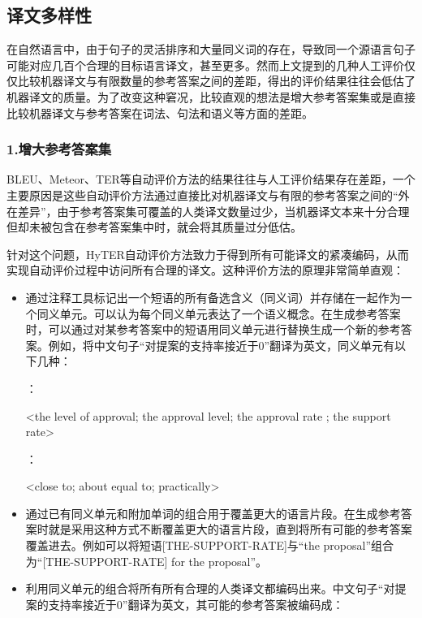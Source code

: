 \subsection{译文多样性}

\parinterval 在自然语言中，由于句子的灵活排序和大量同义词的存在，导致同一个源语言句子可能对应几百个合理的目标语言译文，甚至更多。然而上文提到的几种人工评价仅仅比较机器译文与有限数量的参考答案之间的差距，得出的评价结果往往会低估了机器译文的质量。为了改变这种窘况，比较直观的想法是增大参考答案集或是直接比较机器译文与参考答案在词法、句法和语义等方面的差距。


\subsubsection{1.增大参考答案集}

\parinterval BLEU、Meteor、TER等自动评价方法的结果往往与人工评价结果存在差距，一个主要原因是这些自动评价方法通过直接比对机器译文与有限的参考答案之间的“外在差异”，由于参考答案集可覆盖的人类译文数量过少，当机器译文本来十分合理但却未被包含在参考答案集中时，就会将其质量过分低估。

\parinterval 针对这个问题，HyTER自动评价方法致力于得到所有可能译文的紧凑编码，从而实现自动评价过程中访问所有合理的译文。这种评价方法的原理非常简单直观：

\begin{itemize}
\vspace{0.5em}
\item 通过注释工具标记出一个短语的所有备选含义（同义词）并存储在一起作为一个同义单元。可以认为每个同义单元表达了一个语义概念。在生成参考答案时，可以通过对某参考答案中的短语用同义单元进行替换生成一个新的参考答案。例如，将中文句子“对提案的支持率接近于0”翻译为英文，同义单元有以下几种：

：

\parinterval <the level of approval; the approval level; the approval rate ; the support rate>

\noindent [CLOSE-TO]：

\parinterval <close to; about equal to; practically>
\vspace{0.5em}
\item 通过已有同义单元和附加单词的组合用于覆盖更大的语言片段。在生成参考答案时就是采用这种方式不断覆盖更大的语言片段，直到将所有可能的参考答案覆盖进去。例如可以将短语[THE-SUPPORT-RATE]与“the proposal”组合为“[THE-SUPPORT-RATE] for the proposal”。
\vspace{0.5em}
\item 利用同义单元的组合将所有所有合理的人类译文都编码出来。中文句子“对提案的支持率接近于0”翻译为英文，其可能的参考答案被编码成：
\vspace{0.5em}
\end{itemize}

